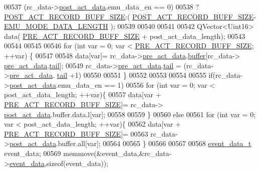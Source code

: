 \begin{DoxyCode}
00537                 (rc\_data->\hyperlink{a00008_a905fb7ebfe7134f1b9f55c92227b5d0c}{post\_act\_data}.emu\_data\_en == 0)
00538                 ?\hyperlink{a00003_ab1ad440de86fff80e517ad748de2ee39}{POST\_ACT\_RECORD\_BUFF\_SIZE}:(
      \hyperlink{a00003_ab1ad440de86fff80e517ad748de2ee39}{POST\_ACT\_RECORD\_BUFF\_SIZE}-\hyperlink{a00003_af4c3a8ad94feb4d7bda7f107f34baf41}{EMU\_MODE\_DATA\_LENGTH} );
00539 
00540 
00541 
00542         QVector<Uint16> data( \hyperlink{a00003_a18dcecc16ded13fa622e0913e73442e6}{PRE\_ACT\_RECORD\_BUFF\_SIZE} + post\_act\_data\_length);
00543 
00544 
00545 
00546         \textcolor{keywordflow}{for} (\textcolor{keywordtype}{int} var = 0; var < \hyperlink{a00003_a18dcecc16ded13fa622e0913e73442e6}{PRE\_ACT\_RECORD\_BUFF\_SIZE}; ++var) \{
00547             
00548             data[var]= rc\_data->\hyperlink{a00008_ac8e7141463960fd1e27eb25547d02555}{pre\_act\_data}.\hyperlink{a00003_a5f6608d29ecab36269ae25b2e7afb1f3}{buffer}[rc\_data->
      \hyperlink{a00008_ac8e7141463960fd1e27eb25547d02555}{pre\_act\_data}.\hyperlink{a00003_a3c4762f0dfae85a9efc17a36c6cb84a6}{tail}];
00549             rc\_data->\hyperlink{a00008_ac8e7141463960fd1e27eb25547d02555}{pre\_act\_data}.\hyperlink{a00003_a3c4762f0dfae85a9efc17a36c6cb84a6}{tail} = (rc\_data->\hyperlink{a00008_ac8e7141463960fd1e27eb25547d02555}{pre\_act\_data}.
      \hyperlink{a00003_a3c4762f0dfae85a9efc17a36c6cb84a6}{tail} +1)%
00550 
00551         \}
00552 
00553 
00554 
00555         \textcolor{keywordflow}{if}(rc\_data->\hyperlink{a00008_a905fb7ebfe7134f1b9f55c92227b5d0c}{post\_act\_data}.emu\_data\_en == 1)
00556             \textcolor{keywordflow}{for} (\textcolor{keywordtype}{int} var = 0; var < post\_act\_data\_length; ++var)\{
00557                 data[var + \hyperlink{a00003_a18dcecc16ded13fa622e0913e73442e6}{PRE\_ACT\_RECORD\_BUFF\_SIZE}]= rc\_data->
      \hyperlink{a00008_a905fb7ebfe7134f1b9f55c92227b5d0c}{post\_act\_data}.buffer.data.l[var];
00558 
00559             \}
00560         \textcolor{keywordflow}{else}
00561             \textcolor{keywordflow}{for} (\textcolor{keywordtype}{int} var = 0; var < post\_act\_data\_length; ++var)\{
00562                 data[var + \hyperlink{a00003_a18dcecc16ded13fa622e0913e73442e6}{PRE\_ACT\_RECORD\_BUFF\_SIZE}]=
00563                 rc\_data->\hyperlink{a00008_a905fb7ebfe7134f1b9f55c92227b5d0c}{post\_act\_data}.buffer.all[var];
00564 
00565             \}
00566 
00567 
00568         \hyperlink{a00003_d0/d89/a00071}{event\_data\_t} event\_data;
00569         memmove(&event\_data,&rc\_data->\hyperlink{a00008_a5a700ec4c240f4e86c5fb61aef8d983e}{event\_data},\textcolor{keyword}{sizeof}(event\_data));

\end{DoxyCode}
